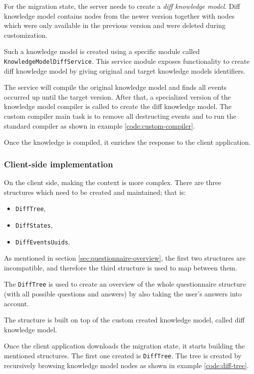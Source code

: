 For the migration state, the server needs to create a \textit{diff knowledge model}.
Diff knowledge model contains nodes from the newer version together with nodes which were only available in the previous version and were deleted during customization.

Such a knowledge model is created using a specific module called \texttt{Knowl\-edge\-Model\-Diff\-Service}.
This service module exposes functionality to create diff knowledge model by giving original and target knowledge models identifiers.

The service will compile the original knowledge model and finds all events occurred up until the target version.
After that, a specialized version of the knowledge model compiler is called to create the diff knowledge model.
The custom compiler main task is to remove all destructing events and to run the standard compiler as shown in example \ref{code:custom-compiler}.

Once the knowledge is compiled, it enriches the response to the client application.


\subsubsection*{Client-side implementation}

On the client side, making the context is more complex.
There are three structures which need to be created and maintained; that is:

\begin{itemize}
    \item \texttt{DiffTree},
    \item \texttt{DiffStates},
    \item \texttt{DiffEventsUuids}.
\end{itemize}

As mentioned in section \ref{sec:questionnaire-overview}, the first two structures are incompatible, and therefore the third structure is used to map between them.

The \texttt{DiffTree} is used to create an overview of the whole questionnaire structure (with all possible questions and answers) by also taking the user's answers into account.

The structure is built on top of the custom created knowledge model, called diff knowledge model.

Once the client application downloads the migration state, it starts building the mentioned structures.
The first one created is \texttt{DiffTree}.
The tree is created by recursively browsing knowledge model nodes as shown in example \ref{code:diff-tree}.

